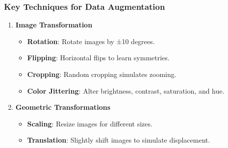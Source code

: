 \documentclass[aspectratio=169]{beamer}
\begin{document}
\begin{frame}[fragile]
    \frametitle{Key Techniques for Data Augmentation}
    \begin{enumerate}
        \item \textbf{Image Transformation}
        \begin{itemize}
            \item \textbf{Rotation}: Rotate images by ±10 degrees.
            \item \textbf{Flipping}: Horizontal flips to learn symmetries.
            \item \textbf{Cropping}: Random cropping simulates zooming.
            \item \textbf{Color Jittering}: Alter brightness, contrast, saturation, and hue.
        \end{itemize}
        \item \textbf{Geometric Transformations}
        \begin{itemize}
            \item \textbf{Scaling}: Resize images for different sizes.
            \item \textbf{Translation}: Slightly shift images to simulate displacement.
        \end{itemize}
    \end{enumerate}
\end{frame}
\end{document}
